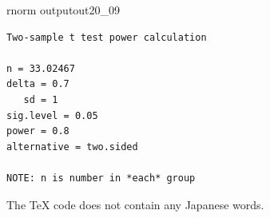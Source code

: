 \begin{Rscreen}{rnorm output}{out20_09}
	\begin{verbatim}
Two-sample t test power calculation 

n = 33.02467
delta = 0.7
   sd = 1
sig.level = 0.05
power = 0.8
alternative = two.sided

NOTE: n is number in *each* group
\end{verbatim}
\end{Rscreen}

The TeX code does not contain any Japanese words.
